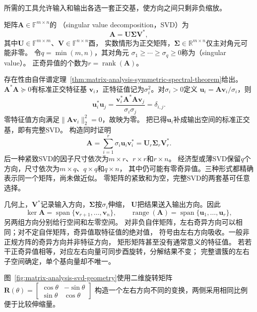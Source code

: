 所需的工具允许输入和输出各选一套正交基，使方向之间只剩非负缩放。
\begin{definition}[奇异值分解]
\label{def:matrix-analysis-svd}
矩阵$\bm A\in\mathbb F^{m\times n}$的
（singular value decomposition，SVD）为
\begin{equation}
 \bm A=\bm U\bm\Sigma\bm V^*,
 \label{eq:matrix-analysis-svd}
\end{equation}
其中$\bm U\in\mathbb F^{m\times m}$、$\bm V\in\mathbb F^{n\times n}$酉，
实数情形为正交矩阵，$\bm\Sigma\in\mathbb R^{m\times n}$仅主对角元可能非零。
令$q=\min(m,n)$，其对角元
$\sigma_1\geq\cdots\geq\sigma_q\geq0$称为（singular value）。
正奇异值的个数为$r=\operatorname{rank}(\bm A)$。
\end{definition}

存在性由自伴谱定理~\ref{thm:matrix-analysis-symmetric-spectral-theorem}给出。$\bm A^*\bm A\succeq0$有标准正交特征基
$\bm v_i$，正特征值记为$\sigma_i^2$。对$\sigma_i>0$定义
$\bm u_i=\bm A\bm v_i/\sigma_i$，则
\[
 \bm u_i^*\bm u_j
 =\frac{\bm v_i^*\bm A^*\bm A\bm v_j}{\sigma_i\sigma_j}
 =\delta_{i,j}.
\]
零特征值方向满足$\lVert\bm A\bm v_i\rVert_2^2=0$，故映为零。
把已得$\bm u_i$补成输出空间的标准正交基，即有完整SVD。
构造同时证明
\begin{equation}
 \bm A=\sum_{i=1}^r\sigma_i\bm u_i\bm v_i^*
       =\bm U_r\bm\Sigma_r\bm V_r^*.
 \label{eq:matrix-analysis-svd-rank-one-sum}
\end{equation}
后一种紧致SVD的因子尺寸依次为$m\times r$、$r\times r$和$r\times n$。
经济型或薄SVD保留$q$个方向，尺寸依次为$m\times q$、$q\times q$和$q\times n$，
其中仍可能有零奇异值。三种形式都精确表示同一个矩阵，尚未做近似。
零矩阵的紧致和为空，完整SVD的两套基可任意选择。

几何上，$\bm V^*$记录输入方向，$\bm\Sigma$按$\sigma_i$伸缩，
$\bm U$把结果送入输出方向。因此
\[
 \ker\bm A=\operatorname{span}\{\bm v_{r+1},\ldots,\bm v_n\},\qquad
 \operatorname{range}(\bm A)=\operatorname{span}\{\bm u_1,\ldots,\bm u_r\},
\]
另两组方向分别给行空间和左零空间。
对非负自伴矩阵，左右奇异方向可以相同；对不定自伴矩阵，奇异值取特征值的绝对值，
符号由左右方向吸收。一般非正规方阵的奇异方向并非特征方向，
矩形矩阵甚至没有通常意义的特征值。
若若干正奇异值相等，对应左右向量可同步酉旋转，分解结果不变；
完整谱簇的左右子空间确定，单个基向量却不唯一。

图~\ref{fig:matrix-analysis-svd-geometry}使用二维旋转矩阵
$\bm R(\theta)=
\left[\begin{smallmatrix}\cos\theta&-\sin\theta\\\sin\theta&\cos\theta\end{smallmatrix}\right]$
构造一个左右方向不同的变换，两侧采用相同比例便于比较伸缩量。

